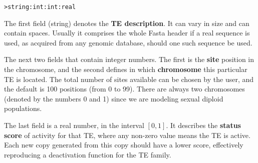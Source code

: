 \documentclass[10pt]{article}
\begin{document}
\bigskip
\verb|>string:int:int:real|
\bigskip

The first field (string) denotes the {\bf TE description}. It can vary
in size and can contain spaces. Usually it comprises the whole Fasta
header if a real sequence is used, as acquired from any genomic
database, should one such sequence be used.

The next two fields that contain integer numbers. The first is the
{\bf site} position in the chromosome, and the second defines in which
{\bf chromosome} this particular TE is located. The total number of
sites available can be chosen by the user, and the default is 100
positions (from 0 to 99). There are always two chromosomes (denoted by
the numbers 0 and 1) since we are modeling sexual diploid
populations.

The last field is a real number, in the interval $[0,1]$. It describes
the {\bf status score} of activity for that TE, where any non-zero
value means the TE is active. Each new copy generated from this copy
should have a lower score, effectively reproducing a deactivation
function for the TE family.















\end{document}
